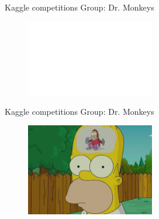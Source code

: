 \begin{frame}{Kaggle competitions}
    \LARGE Group: Dr. Monkeys
    \vspace{29pt}
    \begin{figure}
        \centering
        \vspace{0pt}
        \includegraphics[width=0.5\textwidth]{img/white_space.png}
    \end{figure}
\end{frame}
\begin{frame}{Kaggle competitions}
    \LARGE Group: Dr. Monkeys
    \vspace{10pt}
    \begin{figure}
        \centering
        \vspace{0pt}
        \includegraphics[width=0.5\textwidth]{img/monkey-meme-simpson.jpg}
    \end{figure}
\end{frame}
